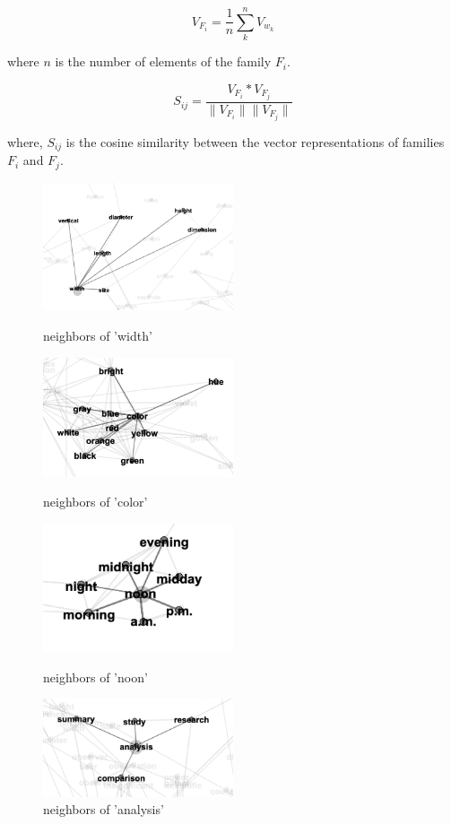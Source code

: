 \documentclass[11pt,a4paper]{article}
\begin{document}
\begin{equation}
  V_{F_i} = \frac{1}{n} \sum_{k}^{n} V_{w_k}
\end{equation}

where ${n}$ is the number of elements of the family ${F_i}$.

\begin{equation}
  S_{ij} = \frac{V_{F_i} * V_{F_j}}{\|V_{F_i}\|  \|V_{F_j}\|}
\end{equation}

where, ${S_{ij}}$ is the cosine similarity between the vector representations of
families ${F_i}$ and ${F_j}$.

\begin{figure}
  \centering
  \includegraphics[width=0.5\textwidth]{network_1}
  \caption{neighbors of 'width'}
  \label{fig:net1}
  \includegraphics[width=0.5\textwidth]{network_2}
  \caption{neighbors of 'color'}
  \label{fig:net2}
  \includegraphics[width=0.5\textwidth]{network_3}
  \caption{neighbors of 'noon'}
  \label{fig:net3}
  \includegraphics[width=0.5\textwidth]{network_4}
  \caption{neighbors of 'analysis'}
  \label{fig:net4}
\end{figure}
\end{document}
